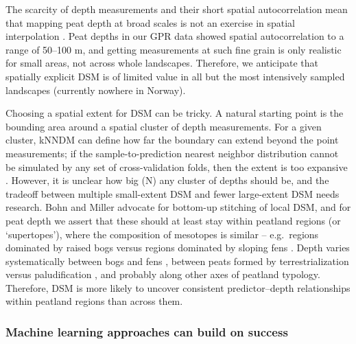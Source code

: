 \documentclass[soil, manuscript]{copernicus}
\begin{document}
The scarcity of depth measurements and their short spatial autocorrelation mean that mapping peat depth at broad scales is not an exercise in spatial interpolation \citep{henglGenericFrameworkSpatial2004}.
Peat depths in our GPR data showed spatial autocorrelation to a range of 50--100 m, and getting measurements at such fine grain is only realistic for small areas, not across whole landscapes.
Therefore, we anticipate that spatially explicit DSM is of limited value in all but the most intensively sampled landscapes (currently nowhere in Norway).

Choosing a spatial extent for DSM can be tricky.
A natural starting point is the bounding area around a spatial cluster of depth measurements.
For a given cluster, kNNDM can define how far the boundary can extend beyond the point measurements; if the sample-to-prediction nearest neighbor distribution cannot be simulated by any set of cross-validation folds, then the extent is too expansive \citep{meyerMachineLearningbasedGlobal2022, linnenbrinkKNNDMCVKfold2024}.
However, it is unclear how big (N) any cluster of depths should be, and the tradeoff between multiple small-extent DSM and fewer large-extent DSM needs research.
Bohn and Miller \citeyearpar{bohnLocallyEnhancedDigital2024} advocate for bottom-up stitching of local DSM, and for peat depth we assert that these should at least stay within peatland regions (or `supertopes'), where the composition of mesotopes is similar -- e.g.~regions dominated by raised bogs versus regions dominated by sloping fens \citep{moenNationalAtlasNorway1999, joostenWiseUseMires2002}.
Depth varies systematically between bogs and fens \citep{lindsayPeatlandMireTypes2016}, between peats formed by terrestrialization versus paludification \citep{buffamFillingHolesRegional2010}, and probably along other axes of peatland typology.
Therefore, DSM is more likely to uncover consistent predictor--depth relationships within peatland regions than across them.

\subsubsection{Machine learning approaches can build on success}
\end{document}
